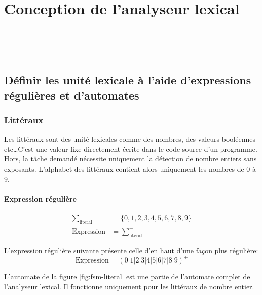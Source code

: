 \section{Conception de l'analyseur lexical}


\\
\\
\\

\subsection{Définir les unité lexicale à l’aide d’expressions régulières et d'automates}

\subsubsection{Littéraux}

Les littéraux sont des unité lexicales comme des nombres, des
valeurs booléennes etc\ldots C'est une valeur fixe directement
écrite dans le code source d'un programme. Hors, la tâche demandé nécessite
uniquement la détection de nombre entiers sans exposants. L'alphabet des
littéraux contient alors uniquement les nombres de 0 à 9.


\paragraph{Expression régulière}

\begin{align}
  \sum_{\textrm{literal}} &= \{0,1,2,3,4,5,6,7,8,9 \} \\
  \textrm{Expression} &= \sum^+_{\textrm{literal}}
\end{align}

L'expression régulière suivante présente celle d'en haut d'une façon plus régulière:
\begin{equation}
  \textrm{Expression} = (0|1|2|3|4|5|6|7|8|9)^+
\end{equation}

L'automate de la figure \ref{fig:fsm-literal} est une partie de l'automate complet de l'analyseur lexical.
Il fonctionne uniquement pour les littéraux de nombre entier.

